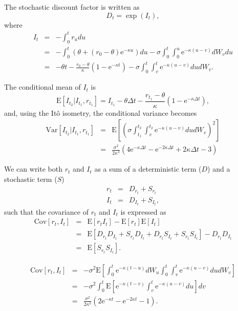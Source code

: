 \documentclass{report}
\newcommand{\E}{\mathrm{E}}
\newcommand{\Var}{\mathrm{Var}}
\newcommand{\Cov}{\mathrm{Cov}}
\newcommand{\e}{\text{e}}
\begin{document}
The stochastic discount factor is written as
\begin{equation}
D_{t} = \exp \left( I_t \right),
\end{equation}
where
\begin{eqnarray}
I_t &=& -\int_0^t r_u du \\
&=& - \int_0^t \left( \theta + \left( r_0 - \theta \right) \e^{-\kappa u } \right) du - \sigma \int_0^t \int_0^u \e^{-\kappa \left(u - v\right)} dW_v du \\
&=& - \theta t - \frac{r_0 - \theta}{\kappa} \left( 1 - \e^{-\kappa t} \right) - \sigma \int_0^t \int_v^t \e^{-\kappa \left(u - v\right)} du dW_v.
\end{eqnarray}

The conditional mean of $I_t$ is
\begin{equation}
\E \left[ I_{t_{2}} | I_{t_1}, r_{t_1} \right] = I_{t_1} - \theta \Delta t 
- \frac{r_{t_1} - \theta}{\kappa} \left( 1 - \e^{-\kappa \Delta t} \right),
\end{equation}
and, using the It\^{o} isometry, the conditional variance becomes
\begin{eqnarray}
\Var \left[ I_{t_{2}} | I_{t_1}, r_{t_1} \right] &=& \E \left[ \left( \sigma \int_{t_1}^{t_2} \int_v^{t_2} \e^{-\kappa \left(u - v\right)} du dW_v \right)^2 \right] \\
&=& \frac{\sigma^2}{2 \kappa^3} \left( 4 \e^{-\kappa \Delta t} - \e^{-2\kappa \Delta t} + 2 \kappa \Delta t - 3 \right)
\end{eqnarray}

We can write both $r_t$ and $I_t$ as a sum of a deterministic term ($D$) and a stochastic term ($S$)
\begin{eqnarray}
r_t &=& D_{r_t} + S_{r_t} \\
I_t &=& D_{I_t} + S_{I_t},
\end{eqnarray}
such that the covariance of $r_t$ and $I_t$ is expressed as
\begin{eqnarray}
\Cov \left[ r_t, I_t \right] &=& \E \left[ r_t I_t \right] - \E \left[ r_t \right] \E \left[ I_t \right] \\
&=& \E \left[ D_{r_t} D_{I_t} + S_{r_t} D_{I_t} + D_{r_t} S_{I_t} + S_{r_t} S_{I_t} \right] - D_{r_t} D_{I_t} \\
&=& \E \left[ S_{r_t} S_{I_t} \right].
\end{eqnarray}

\begin{eqnarray}
\Cov \left[ r_t, I_t \right] &=& - \sigma^2 \E \left[ \int_0^t \e^{-\kappa (t - u)} dW_u \int_0^t \int_v^t \e^{-\kappa(u-v)} du dW_v \right] \\
&=& -\sigma^2 \int_0^t \E \left[ \e^{-\kappa(t-v)} \int_v^t \e^{-\kappa(u-v)} du \right] dv \\
&=& \frac{\sigma^2}{2 \kappa^2} \left( 2 \e^{-\kappa t} - \e^{-2\kappa t} - 1 \right).
\end{eqnarray}
\end{document}
